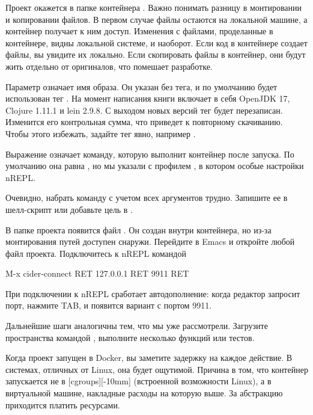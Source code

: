 Проект окажется в папке контейнера . Важно понимать разницу в монтировании и копировании файлов. В первом случае файлы остаются на локальной машине, а контейнер получает к ним доступ. Изменения с файлами, проделанные в контейнере, видны локальной системе, и наоборот. Если код в контейнере создает файлы, вы увидите их локально. Если скопировать файлы в контейнер, они будут жить отдельно от оригиналов, что помешает разработке.

Параметр   означает имя образа. Он указан без тега, и по умолчанию будет использован тег . На момент написания книги  включает в себя OpenJDK 17, Clojure 1.11.1 и lein 2.9.8. С выходом новых версий тег  будет перезаписан. Изменится его контрольная сумма, что приведет к повторному скачиванию. Чтобы этого избежать, задайте тег явно, например .

Выражение   означает команду, которую выполнит контейнер после запуска. По умолчанию она равна , но мы указали  с профилем , в котором особые настройки nREPL.

Очевидно, набрать команду  с учетом всех аргументов трудно. Запишите ее в шелл-скрипт или добавьте цель в .

В папке проекта появится файл . Он создан внутри контейнера, но из-за монтирования путей доступен снаружи. Перейдите в Emacs и откройте любой файл проекта. Подключитесь к nREPL командой

\begin{english}
  \begin{text}
M-x cider-connect RET 127.0.0.1 RET 9911 RET
  \end{text}
\end{english}

При подключении к nREPL сработает автодополнение: когда редактор запросит порт, нажмите TAB, и появится вариант с портом 9911.

Дальнейшие шаги аналогичны тем, что мы уже рассмотрели. Загрузите пространства командой , выполните несколько функций или тестов.

\def\urlcgroups{https://en.wikipedia.org/wiki/Cgroups}


Когда проект запущен в Docker, вы заметите задержку на каждое действие. В системах, отличных от Linux, она будет ощутимой. Причина в том, что контейнер запускается не в \footurl{cgroups}{\urlcgroups}[cgroups][-10mm] (встроенной возможности Linux), а в виртуальной машине, накладные расходы на которую выше. За абстракцию приходится платить ресурсами.

